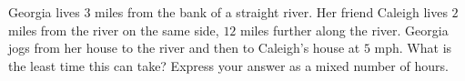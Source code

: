 Georgia lives $3$ miles from the bank of a straight river. Her friend Caleigh lives $2$ miles from the river on the same side, $12$ miles further along the river. Georgia jogs from her house to the river and then to Caleigh's house at $5$ mph. What is the least time this can take? Express your answer as a mixed number of hours.
